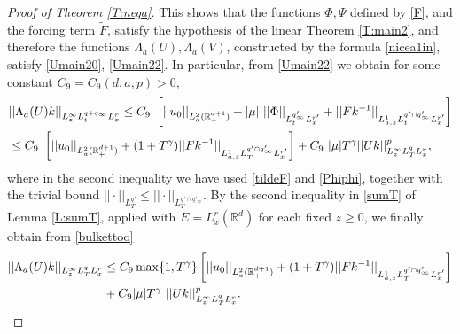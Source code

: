 \documentclass[11pt,letter]{amsart}
\def \RN {\mathbb{R}_+^{d+1}}
\newcommand{\Rd}{\mathbb R^d}
\numberwithin{equation}{section}
\numberwithin{equation}{section}
\begin{document}
\begin{proof}[Proof of Theorem \ref{T:nega}]
This shows that the functions $\Phi, \Psi$ defined by \eqref{F}, and the forcing term $\tilde F$, satisfy the hypothesis of the linear Theorem \ref{T:main2}, and therefore the functions $\Lambda_a(U), \Lambda_a(V)$, constructed by the formula \eqref{nicea1in}, satisfy \eqref{Umain20}, \eqref{Umain22}. In particular, from \eqref{Umain22} we obtain for some constant $C_9 = C_9(d,a,p)>0$, 
\begin{align}\label{bulkettoo}
& ||\Lambda_a(U) k||_{L^\infty_z L^{q+q_\infty}_t L^r_x } \le C_9\ \left[||u_0||_{L^2_a(\RN)} +  |\mu|\ ||\Phi||_{L^{q'_\infty}_t L^{r'}_x} + ||\tilde F k^{-1}||_{L^1_{a,z} L^{q'\cap q'_\infty}_t L^{r'}_x }\right]
\\
& \le C_9\ \left[||u_0||_{L^2_a(\RN)}  + (1+T^{\gamma}) ||F k^{-1}||_{L^1_{a,z} L^{q'\cap q'_\infty}_T L^{r'}_x }\right] + C_9\ |\mu| T^{\gamma}  ||U k||_{L^\infty_z L^q_T L^r_x }^p,
\notag
\end{align}
where in the second inequality we have used \eqref{tildeF} and \eqref{Phiphi}, together with the trivial bound $||\cdot||_{L^{q'}_T}\le ||\cdot||_{L^{q'\cap q'_\infty}_T}$.
By the second inequality in \eqref{sumT} of Lemma \ref{L:sumT}, applied with $E = L^r_x(\Rd)$ for each fixed $z\ge 0$, we finally obtain from \eqref{bulkettoo}
\begin{align}\label{bulkettooo}
||\Lambda_a(U) k||_{L^\infty_z L^{q}_T L^r_x } & \le  C_9 \max\{1,T^{\gamma}\}\left[||u_0||_{L^2_a(\RN)}  + (1+T^{\gamma}) ||F k^{-1}||_{L^1_{a,z} L^{q'\cap q'_\infty}_T L^{r'}_x }\right]
\\
& + C_9 |\mu| T^{\gamma}\  ||U k||_{L^\infty_z L^q_T L^r_x }^p.
\notag
\end{align}


\end{proof}
\end{document}
